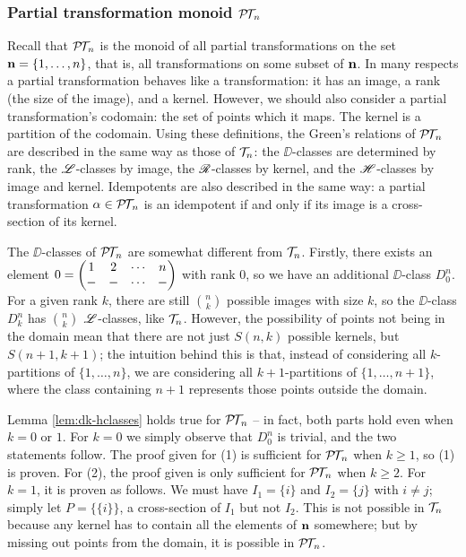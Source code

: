 \subsubsection{Partial transformation monoid $\mathcal{P\!T\!}_n$}
\label{sec:princfact-in}
Recall that $\mathcal{P\!T\!}_n$ is the monoid of all partial transformations on the set
$\mathbf{n} = \{1, \ldots, n\}$, that is, all transformations on some subset of $\mathbf{n}$.
In many respects a partial transformation behaves like a transformation: it has
an image, a rank (the size of the image), and a kernel.  However, we should also
consider a partial transformation's codomain: the set of points which it maps.
The kernel is a partition of the codomain.  Using these definitions, the Green's
relations of $\mathcal{P\!T\!}_n$ are described in the same way as those of $\mathcal{T}_n$: the
$\DD$-classes are determined by rank, the $\mathrel{\mathscr{L}}$-classes by image, the
$\mathrel{\mathscr{R}}$-classes by kernel, and the $\mathrel{\mathscr{H}}$-classes by image and kernel.  Idempotents
are also described in the same way: a partial transformation $\alpha \in \mathcal{P\!T\!}_n$
is an idempotent if and only if its image is a cross-section of its kernel.

The $\DD$-classes of $\mathcal{P\!T\!}_n$ are somewhat different from $\mathcal{T}_n$.  Firstly, there
exists an element $0 = \begin{pmatrix} 1 & 2 & \cdots & n \\ - & - & \cdots & - \end{pmatrix}$ with rank $0$, so we have an additional
$\DD$-class $D_0^n$.  For a given rank $k$, there are still $\binom{n}{k}$
possible images with size $k$, so the $\DD$-class $D_k^n$ has $\binom{n}{k}$
$\mathrel{\mathscr{L}}$-classes, like $\mathcal{T}_n$.  However, the possibility of points not being in the
domain mean that there are not just $S(n,k)$ possible kernels, but
$S(n+1, k+1)$; the intuition behind this is that, instead of considering all
$k$-partitions of $\{1, \ldots, n\}$, we are considering all $k+1$-partitions of
$\{1, \ldots, n+1\}$, where the class containing $n+1$ represents those points
outside the domain.

Lemma \ref{lem:dk-hclasses} holds true for $\mathcal{P\!T\!}_n$ -- in fact, both parts hold
even when $k = 0$ or $1$.  For $k=0$ we simply observe that $D_0^n$ is trivial,
and the two statements follow.  The proof given for (1) is sufficient for
$\mathcal{P\!T\!}_n$ when $k \geq 1$, so (1) is proven.  For (2), the proof given is only
sufficient for $\mathcal{P\!T\!}_n$ when $k \geq 2$.  For $k=1$, it is proven as follows.  We
must have $I_1 = \{i\}$ and $I_2 = \{j\}$ with $i \neq j$; simply let
$P = \big\{\{i\}\big\}$, a cross-section of $I_1$ but not $I_2$.  This is not
possible in $\mathcal{T}_n$ because any kernel has to contain all the elements of $\mathbf{n}$
somewhere; but by missing out points from the domain, it is possible in $\mathcal{P\!T\!}_n$.

